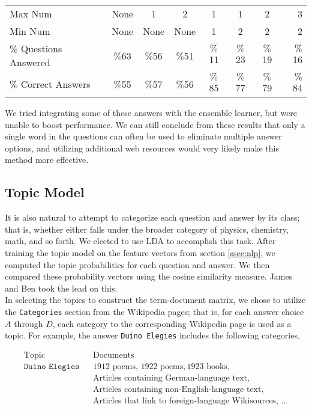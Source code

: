 \documentclass{article}
\theoremstyle{mystuff}
\theoremstyle{myexample}
\theoremstyle{named}
\begin{document}
\begin{center}
\begin{tabular}{l*{6}{c}r}
Max Num             & None & 1 & 2 & 1 & 1  & 2 & 3 \\
Min Num             & None & None & None & 1 & 2  & 2 & 2 \\
\hline
$\%$ Questions Answered & $\%$63 & $\%$56 & $\%$51 & $\%$11 & $\%$23 & $\%$19 & $\%$16  \\
$\%$ Correct Answers  & $\%$55 & $\%$57 & $\%$56 & $\%$85 &  $\%$77 & $\%$79 &  $\%$84  \\
\end{tabular}
\end{center}

We tried integrating some of these answers with the ensemble learner, but were unable to boost performance. We can still conclude from these results that only a single word in the questions can often be used to eliminate multiple answer options, and utilizing additional web resources would very likely make this method more effective.


\subsection{Topic Model}
\label{ssec:topic_model}
It is also natural to attempt to categorize each question and answer by its class; that is, whether either falls under the broader category of physics, chemistry, math, and so forth.  We elected to use LDA to accomplish this task.  After training the topic model on the feature vectors from section \ref{ssec:nlp}, we computed the topic probabilities for each question and answer.  We then compared these probability vectors using the cosine similarity measure.  James and Ben took the lead on this.\\

In selecting the topics to construct the term-document matrix, we chose to utilize the \texttt{Categories} section from the Wikipedia pages; that is, for each answer choice $A$ through $D$, each category to the corresponding Wikipedia page is used as a topic. For example, the answer \texttt{Duino Elegies} includes the following categories, 

\[
	\begin{array}{lll}
		\text{Topic} & & \text{Documents} \\ \hline
		\texttt{Duino Elegies} & & \text{1912 poems}, \, \text{1922 poems}, \text{1923 books}, \\
		& & \text{Articles containing German-language text}, \\
		& &  \text{Articles containing non-English-language text}, \\
		& &  \text{Articles that link to foreign-language Wikisources}, \, \ldots
	\end{array}
\]
\end{document}

